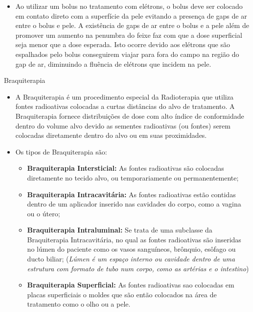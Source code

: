 \documentclass[11pt,a4paper]{article}
\newcounter{exemplo}
\begin{document}
\begin{exemplo}
\begin{itemize}
        \item Ao utilizar um bolus no tratamento com elétrons, o bolus deve ser colocado em contato direto com a  superfície da pele evitando a presença de gaps de ar entre o bolus e pele. A existência de gaps de ar entre o bolus e a pele além de promover um aumento na penumbra do feixe faz com que a dose superficial seja menor que a dose esperada. Isto ocorre devido aos elétrons que são espalhados pelo bolus conseguirem viajar para fora do campo na região do gap de ar, diminuindo a fluência de elétrons que incidem na pele.

    \end{itemize}
\end{exemplo}

\begin{exemplo}[8. Braquiterapia]
    \textcolor{CarnationPink}{Braquiterapia}
    \begin{itemize}
        \item A Braquiterapia é um procedimento especial da Radioterapia que utiliza fontes radioativas colocadas a curtas distâncias do alvo de tratamento. A Braquiterapia fornece distribuições de dose com alto índice de conformidade dentro do volume alvo devido as sementes radioativas (ou fontes) serem colocadas diretamente dentro do alvo ou em suas proximidades.
        
        \item Os tipos de Braquiterapia são:
        
            \begin{itemize}[label=\textcolor{CarnationPink}{\textopenbullet}]
                \item \textcolor{CarnationPink}{\textbf{Braquiterapia Intersticial:}} As fontes radioativas são colocadas diretamente no tecido alvo, ou temporariamente ou permanentemente;
                \item \textcolor{CarnationPink}{\textbf{Braquiterapia Intracavitária:}} As fontes radioativas estão contidas dentro de um aplicador inserido nas cavidades do corpo, como a vagina ou o útero;
                \item \textcolor{CarnationPink}{\textbf{Braquiterapia Intraluminal:}} Se trata de uma subclasse da Braquiterapia Intracavitária, no qual as fontes radioativas são inseridas no lúmen do paciente como os vasos sanguíneos, brônquio, esôfago ou ducto biliar; (\textit{Lúmen é um espaço interno ou cavidade dentro de uma estrutura com formato de tubo num corpo, como as artérias e o intestino})
                \item \textcolor{CarnationPink}{\textbf{Braquiterapia Superficial:}} As fontes radioativas sao colocadas em placas superficiais o moldes que são então colocados na área de tratamento como o olho ou a pele. 
            \end{itemize}


\end{itemize}
\end{exemplo}
\end{document}
